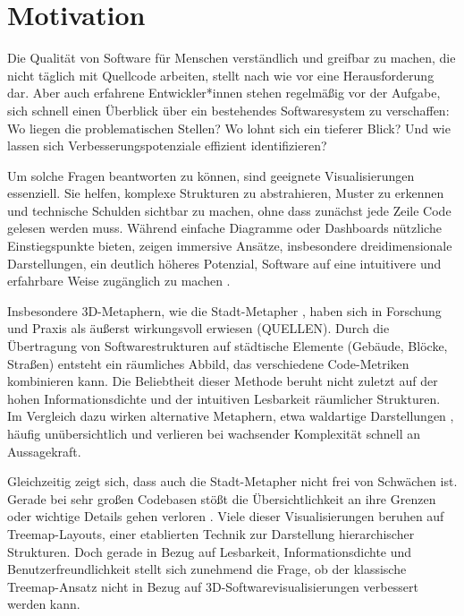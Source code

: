 \chapter{Motivation} \label{sec:Motivation}
Die Qualität von Software für Menschen verständlich und greifbar zu machen, die nicht täglich mit Quellcode arbeiten, stellt nach wie vor eine Herausforderung dar. Aber auch erfahrene Entwickler*innen stehen regelmäßig vor der Aufgabe, sich schnell einen Überblick über ein bestehendes Softwaresystem zu verschaffen: Wo liegen die problematischen Stellen? Wo lohnt sich ein tieferer Blick? Und wie lassen sich Verbesserungspotenziale effizient identifizieren?

Um solche Fragen beantworten zu können, sind geeignete Visualisierungen essenziell. Sie helfen, komplexe Strukturen zu abstrahieren, Muster zu erkennen und technische Schulden sichtbar zu machen, ohne dass zunächst jede Zeile Code gelesen werden muss. Während einfache Diagramme oder Dashboards nützliche Einstiegspunkte bieten, zeigen immersive Ansätze, insbesondere dreidimensionale Darstellungen, ein deutlich höheres Potenzial, Software auf eine intuitivere und erfahrbare Weise zugänglich zu machen \cite{3dsoftwareMarcus,codeCity1,first_3D_vis,virtualButVisibleMunro}.

Insbesondere 3D-Metaphern, wie die Stadt-Metapher \cite{codeCity1}, haben sich in Forschung und Praxis als äußerst wirkungsvoll erwiesen (QUELLEN). Durch die Übertragung von Softwarestrukturen auf städtische Elemente (Gebäude, Blöcke, Straßen) entsteht ein räumliches Abbild, das verschiedene Code-Metriken kombinieren kann. Die Beliebtheit dieser Methode beruht nicht zuletzt auf der hohen Informationsdichte und der intuitiven Lesbarkeit räumlicher Strukturen. Im Vergleich dazu wirken alternative Metaphern, etwa waldartige Darstellungen \cite{softwareForest}, häufig unübersichtlich und verlieren bei wachsender Komplexität schnell an Aussagekraft.

Gleichzeitig zeigt sich, dass auch die Stadt-Metapher nicht frei von Schwächen ist. Gerade bei sehr großen Codebasen stößt die Übersichtlichkeit an ihre Grenzen oder wichtige Details gehen verloren \cite{lu2008cascaded}. Viele dieser Visualisierungen beruhen auf Treemap-Layouts, einer etablierten Technik zur Darstellung hierarchischer Strukturen. Doch gerade in Bezug auf Lesbarkeit, Informationsdichte und Benutzerfreundlichkeit stellt sich zunehmend die Frage, ob der klassische Treemap-Ansatz nicht in Bezug auf 3D-Softwarevisualisierungen verbessert werden kann.

